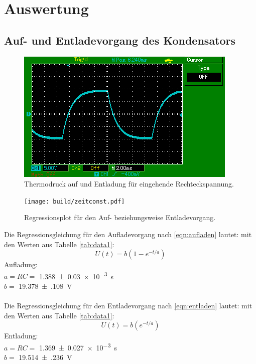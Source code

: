 \section{Auswertung}
\label{sec:Auswertung}

\subsection{Auf- und Entladevorgang des Kondensators}

\begin{figure}[H]
  \centering
  \includegraphics{content/images/a/ladekurve.png}
  \caption{Thermodruck auf und Entladung für eingehende Rechteckspannung.}
  \label{fig:lade}
\end{figure}

\begin{figure}[H]
  \centering
  \texttt{[image: build/zeitconst.pdf]}
  \caption{Regressionsplot für den Auf- beziehungsweise Entladevorgang.}
  \label{fig:lade_plot}
\end{figure}
Die Regressionsgleichung für den Aufladevorgang nach \eqref{eqn:aufladen} lautet:
mit den Werten aus Tabelle \ref{tab:data1}:
\begin{equation}
  U(t)=b\left(1-e^{-t/a}\right)
\end{equation}
Aufladung:\\
$a=RC=$ \SI{1.388(30)e-3}{\second}\\
$b=$ \SI{19.378(108)}{\volt}\\\\
Die Regressionsgleichung für den Entladevorgang nach \eqref{eqn:entladen} lautet:
mit den Werten aus Tabelle \ref{tab:data1}:
\begin{equation}
  U(t)=b\left(e^{-t/a}\right)
\end{equation}
Entladung: \\
$a=RC=$ \SI{1.369(27)e-3}{\second}\\
$b=$ \SI{19.514(236)}{\volt}

